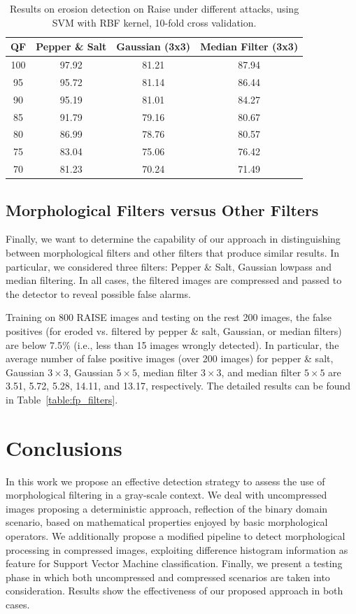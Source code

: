 \documentclass[review]{elsarticle}
\begin{document}
\begin{table}[h!]
	\centering
	\caption{Results on erosion detection on Raise under different attacks, using SVM with RBF kernel, 10-fold cross validation.}
	\label{table:attacks2}
	\begin{tabular}{c|ccc}
		\hline\hline
		\textbf{QF} & \textbf{Pepper \& Salt}&\textbf{Gaussian (3x3)}&\textbf{Median Filter (3x3)}\\
		\hline
		100&97.92&81.21&87.94\\
		95&95.72&81.14&86.44\\
		90&95.19&81.01&84.27\\
		85&91.79&79.16&80.67\\
		80&86.99&78.76&80.57\\
		75&83.04&75.06&76.42\\
		70&81.23&70.24&71.49\\
		\hline\hline	
	\end{tabular}
\end{table}

\subsection{Morphological Filters versus Other Filters }
\label{subsec:results_different_filters}

Finally, we want to determine the capability of our approach in distinguishing between morphological filters and other filters that produce similar results. In particular, we considered three filters: Pepper \& Salt, Gaussian lowpass and median filtering. In all cases, the filtered images are compressed and passed to the detector to reveal possible false alarms. 

Training on 800 RAISE images and testing on the rest 200 images, the false positives (for eroded vs. filtered by pepper \& salt, Gaussian, or median filters) are below 7.5\% (i.e., less than 15 images wrongly detected). In particular, the average number of false positive images (over 200 images) for pepper \& salt, Gaussian $3 \times 3$, Gaussian $5 \times 5$, median filter $3 \times 3$, and median filter $5 \times 5$ are 3.51, 5.72, 5.28, 14.11, and 13.17, respectively. The detailed results can be found in Table~\ref{table:fp_filters}. 


\section{Conclusions}
\label{sec:conclusions}
In this work we propose an effective detection strategy to assess the use of morphological filtering in a gray-scale context. We deal with uncompressed images proposing a deterministic approach, reflection of the binary domain scenario, based on mathematical properties enjoyed by basic morphological operators. We additionally propose a modified pipeline to detect morphological processing in compressed images, exploiting difference histogram information as feature for Support Vector Machine classification. Finally, we present a testing phase in which both uncompressed and compressed scenarios are taken into consideration. Results show the effectiveness of our proposed approach in both cases.  
 
\end{document}
